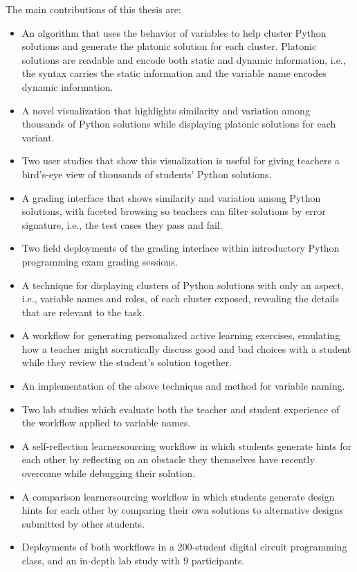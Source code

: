 The main contributions of this thesis are:
\begin{itemize}
\item An algorithm that uses the behavior of variables to help cluster Python solutions and generate the platonic solution for each cluster. Platonic solutions are readable and encode both static and dynamic information, i.e., the syntax carries the static information and the variable name encodes dynamic information.
\item A novel visualization that highlights similarity and variation among thousands of Python solutions while displaying platonic solutions for each variant. 
\item Two user studies that show this visualization is useful for giving teachers a bird's-eye view of thousands of students' Python solutions.
\item A grading interface that shows similarity and variation among Python solutions, with faceted browsing so teachers can filter solutions by error signature, i.e., the test cases they pass and fail. 
\item Two field deployments of the grading interface within introductory Python programming exam grading sessions.
\item A technique for displaying clusters of Python solutions with only an aspect, i.e., variable names and roles, of each cluster exposed, revealing the details that are relevant to the task. %
\item A workflow for generating personalized active learning exercises, emulating how a teacher might socratically discuss good and bad choices with a student while they review the student's solution together. 
\item An implementation of the above technique and method for variable naming. %
\item Two lab studies which evaluate both the teacher and student experience of the workflow applied to variable names.
\item A self-reflection learnersourcing workflow in which students generate hints for each other by reflecting on an obstacle they themselves have recently overcome while debugging their solution.
\item A comparison learnersourcing workflow in which students generate design hints for each other by comparing their own solutions to alternative designs submitted by other students.
\item Deployments of both workflows in a 200-student digital circuit programming class, and an in-depth lab study with 9 participants.
\end{itemize}

